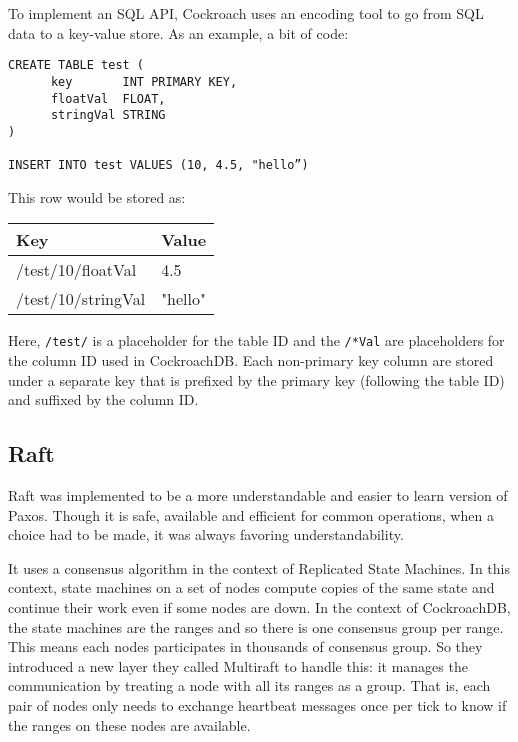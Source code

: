 To implement an SQL API, Cockroach uses an encoding tool to go from SQL data to a key-value store\cite{CRDB:mapKV}. As an example, a bit of code:
\begin{verbatim}
CREATE TABLE test (
      key       INT PRIMARY KEY,
      floatVal  FLOAT,
      stringVal STRING
)

INSERT INTO test VALUES (10, 4.5, "hello”)
\end{verbatim}

This row would be stored as:

\begin{center}
\begin{tabular}{|l|l|}
\hline
Key & Value\\
\hline
/test/10/floatVal & 4.5\\
/test/10/stringVal & "hello"\\
\hline
\end{tabular}
\end{center}

Here, \verb~/test/~ is a placeholder for the table ID and the \verb~/*Val~ are placeholders for the column ID used in CockroachDB. Each non-primary key column are stored under a separate key that is prefixed by the primary key (following the table ID) and suffixed by the column ID.

\subsection{Raft}

Raft was implemented to be a more understandable and easier to learn version of Paxos\cite{DBLP:conf/usenix/OngaroO14}. Though it is safe, available and efficient for common operations, when a choice had to be made, it was always favoring understandability.


It uses a consensus algorithm in the context of Replicated State Machines. In this context, state machines on a set of nodes compute copies of the same state and continue their work even if some nodes are down. In the context of CockroachDB, the state machines are the ranges and so there is one consensus group per range. This means each nodes participates in thousands of consensus group. So they introduced a new layer they called Multiraft to handle this: it manages the communication by treating a node with all its ranges as a group. That is, each pair of nodes only needs to exchange heartbeat messages once per tick to know if the ranges on these nodes are available\cite{CRDB:multiraft}.


